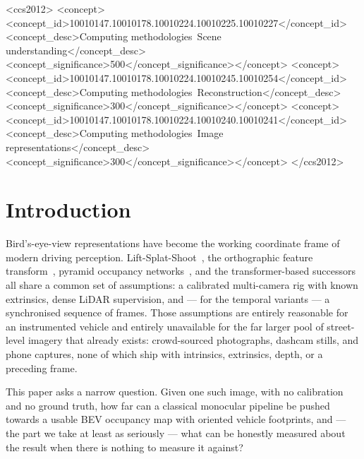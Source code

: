 \documentclass[sigconf]{acmart}
\begin{document}
\begin{CCSXML}
<ccs2012>
<concept><concept_id>10010147.10010178.10010224.10010225.10010227</concept_id>
<concept_desc>Computing methodologies~Scene understanding</concept_desc><concept_significance>500</concept_significance></concept>
<concept><concept_id>10010147.10010178.10010224.10010245.10010254</concept_id>
<concept_desc>Computing methodologies~Reconstruction</concept_desc><concept_significance>300</concept_significance></concept>
<concept><concept_id>10010147.10010178.10010224.10010240.10010241</concept_id>
<concept_desc>Computing methodologies~Image representations</concept_desc><concept_significance>300</concept_significance></concept>
</ccs2012>
\end{CCSXML}


\maketitle

\section{Introduction}

Bird's-eye-view representations have become the working coordinate frame of modern driving perception. Lift-Splat-Shoot~\cite{philion2020lss}, the orthographic feature transform~\cite{roddick2019oft}, pyramid occupancy networks~\cite{roddick2020pon}, and the transformer-based successors~\cite{huang2021bevdet,li2022bevformer,zhou2022cvt} all share a common set of assumptions: a calibrated multi-camera rig with known extrinsics, dense LiDAR supervision, and --- for the temporal variants --- a synchronised sequence of frames. Those assumptions are entirely reasonable for an instrumented vehicle and entirely unavailable for the far larger pool of street-level imagery that already exists: crowd-sourced photographs, dashcam stills, and phone captures, none of which ship with intrinsics, extrinsics, depth, or a preceding frame.

This paper asks a narrow question. Given one such image, with no calibration and no ground truth, how far can a classical monocular pipeline be pushed towards a usable BEV occupancy map with oriented vehicle footprints, and --- the part we take at least as seriously --- what can be honestly measured about the result when there is nothing to measure it against?
\end{document}
